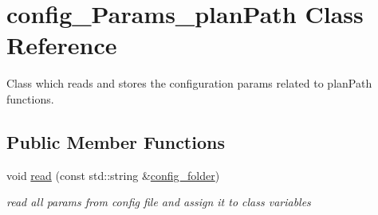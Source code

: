 \hypertarget{classconfig__Params__planPath}{}\section{config\+\_\+\+Params\+\_\+plan\+Path Class Reference}
\label{classconfig__Params__planPath}


Class which reads and stores the configuration params related to plan\+Path functions.  


\subsection*{Public Member Functions}
\begin{DoxyCompactItemize}
\item 
void \hyperlink{classconfig__Params__planPath_aa0450f0e52f8134af81358873a9cca4b}{read} (const std\+::string \&\hyperlink{classconfig__Params__planPath_a03290d421ed527b13a4caed9caec2de8}{config\+\_\+folder})
\begin{DoxyCompactList}\small\item\em read all params from config file and assign it to class variables \end{DoxyCompactList}\end{DoxyCompactItemize}
